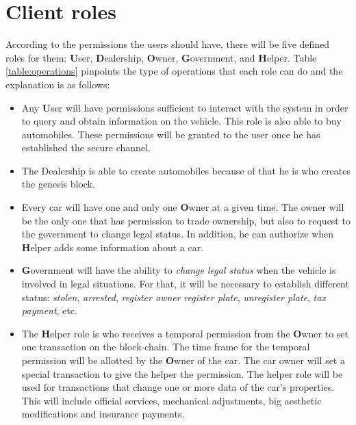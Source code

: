\section{Client roles}

According to the permissions the users should have, there will be five defined roles for them: 
\textbf{U}ser,
\textbf{D}ealership,
\textbf{O}wner,
\textbf{G}overnment, and
\textbf{H}elper.
Table \ref{table:operations} pinpoints the type of operations that each role can do and the explanation
is as follows: 
\begin{itemize}
    \item Any \textbf{U}ser will have permissions sufficient to interact with the system in order to 
        query and obtain information on the     vehicle. This role is also able to buy automobiles. 
        These permissions will be granted to the user once he has established the secure channel. 
    \item The {D}ealership is able to create automobiles because of that he is who creates the 
        genesis block.
    \item Every car will have one and only one \textbf{O}wner at a given time. The owner will be the only one 
        that has permission to trade ownership, but also to request to the government to change legal
        status. In addition, he can authorize when \textbf{H}elper adds some information about a car.
    \item \textbf{G}overnment will have the ability to  \textit{change legal status} when the 
        vehicle is involved in legal situations. For that, it will be necessary to establish 
        different status: \textit{stolen}, \textit{arrested}, \textit{register owner} \textit{register plate}, 
        \textit{unregister plate}, \textit{tax payment}, etc.
    \item The \textbf{H}elper role is who receives a temporal permission from the \textbf{O}wner to set one 
        transaction on the block-chain. The time frame for the temporal permission will be allotted by 
        the \textbf{O}wner of the car. The car owner will set a special transaction to give the helper 
        the permission. The helper role will be used for transactions that change one or more data of the 
        car's properties. This will include official services, mechanical adjustments, big aesthetic 
        modifications and insurance payments.
\end{itemize}







